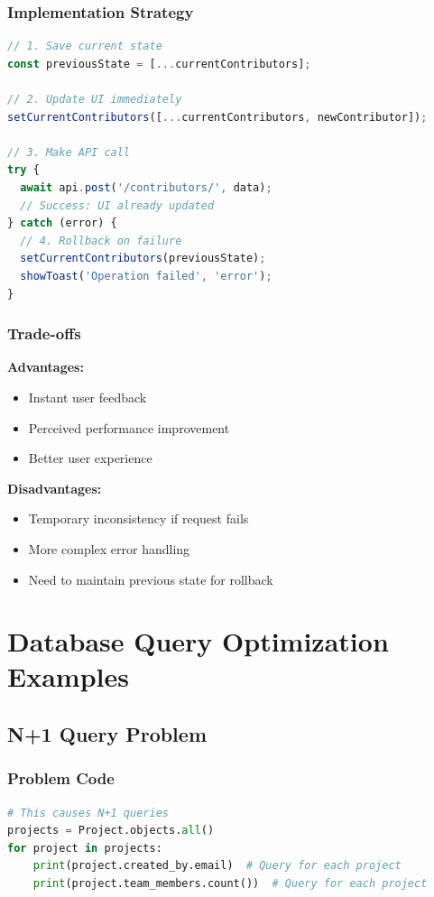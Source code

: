 \documentclass[11pt,a4paper]{article}
\begin{document}
\subsubsection{Implementation Strategy}
\begin{lstlisting}[language=TypeScript]
// 1. Save current state
const previousState = [...currentContributors];

// 2. Update UI immediately
setCurrentContributors([...currentContributors, newContributor]);

// 3. Make API call
try {
  await api.post('/contributors/', data);
  // Success: UI already updated
} catch (error) {
  // 4. Rollback on failure
  setCurrentContributors(previousState);
  showToast('Operation failed', 'error');
}
\end{lstlisting}

\subsubsection{Trade-offs}
\textbf{Advantages:}
\begin{itemize}[leftmargin=*]
    \item Instant user feedback
    \item Perceived performance improvement
    \item Better user experience
\end{itemize}

\textbf{Disadvantages:}
\begin{itemize}[leftmargin=*]
    \item Temporary inconsistency if request fails
    \item More complex error handling
    \item Need to maintain previous state for rollback
\end{itemize}

\section{Database Query Optimization Examples}

\subsection{N+1 Query Problem}

\subsubsection{Problem Code}
\begin{lstlisting}[language=Python]
# This causes N+1 queries
projects = Project.objects.all()
for project in projects:
    print(project.created_by.email)  # Query for each project
    print(project.team_members.count())  # Query for each project
\end{lstlisting}
\end{document}
